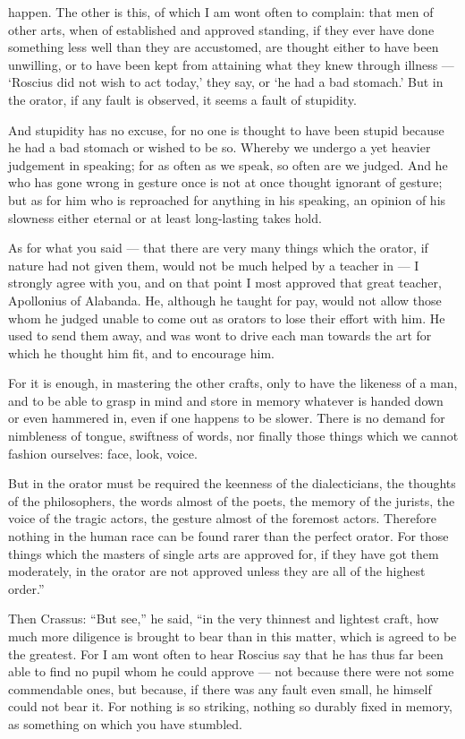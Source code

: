  happen. The other is this, of which I am wont often to complain: that men of other arts, when of established and approved standing, if they ever have done something less well than they are accustomed, are thought either to have been unwilling, or to have been kept from attaining what they knew through illness — `Roscius did not wish to act today,' they say, or `he had a bad stomach.' But in the orator, if any fault is observed, it seems a fault of stupidity.

 And stupidity has no excuse, for no one is thought to have been stupid because he had a bad stomach or wished to be so. Whereby we undergo a yet heavier judgement in speaking; for as often as we speak, so often are we judged. And he who has gone wrong in gesture once is not at once thought ignorant of gesture; but as for him who is reproached for anything in his speaking, an opinion of his slowness either eternal or at least long-lasting takes hold.

 As for what you said — that there are very many things which the orator, if nature had not given them, would not be much helped by a teacher in — I strongly agree with you, and on that point I most approved that great teacher, Apollonius of Alabanda. He, although he taught for pay, would not allow those whom he judged unable to come out as orators to lose their effort with him. He used to send them away, and was wont to drive each man towards the art for which he thought him fit, and to encourage him.

 For it is enough, in mastering the other crafts, only to have the likeness of a man, and to be able to grasp in mind and store in memory whatever is handed down or even hammered in, even if one happens to be slower. There is no demand for nimbleness of tongue, swiftness of words, nor finally those things which we cannot fashion ourselves: face, look, voice.

 But in the orator must be required the keenness of the dialecticians, the thoughts of the philosophers, the words almost of the poets, the memory of the jurists, the voice of the tragic actors, the gesture almost of the foremost actors. Therefore nothing in the human race can be found rarer than the perfect orator. For those things which the masters of single arts are approved for, if they have got them moderately, in the orator are not approved unless they are all of the highest order.''

 Then Crassus: ``But see,'' he said, ``in the very thinnest and lightest craft, how much more diligence is brought to bear than in this matter, which is agreed to be the greatest. For I am wont often to hear Roscius say that he has thus far been able to find no pupil whom he could approve — not because there were not some commendable ones, but because, if there was any fault even small, he himself could not bear it. For nothing is so striking, nothing so durably fixed in memory, as something on which you have stumbled.

